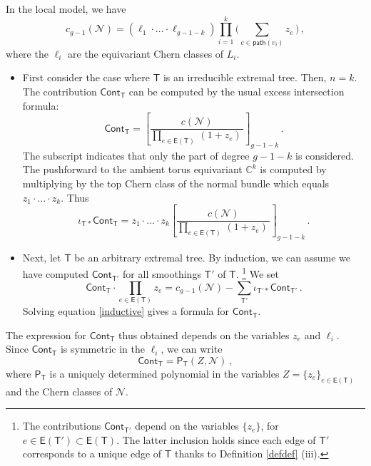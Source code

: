 \documentclass[11pt]{amsart}
\theoremstyle{definition}
\newcommand{\N}{\mathcal{N}}
\begin{document}
{In the local model, we have
\[
c_{g-1}(\N)=(\ell_1\cdot\ldots\cdot \ell_{g-1-k})\prod_{i=1}^k\big(\sum_{e\in \mathsf{path}(v_i)} z_e\, \big)\,,
\]
where the $\ell_i$ are the equivariant Chern classes of $L_i$.



\begin{itemize}
    \item [(i)] First consider the case where $\mathsf{T}$ is an irreducible extremal tree. Then, $n=k$. The contribution $\mathsf{Cont}_\mathsf{T}$ can be computed by the usual excess intersection formula:
    \begin{equation}\label{compcont}
    \mathsf{Cont}_\mathsf{T}=\left[\frac{c(\N)}{\prod_{e\in \mathsf E(\mathsf T)} \,(1+z_e)\,}\right]_{g-1-k}\,.
    \end{equation} The subscript indicates that only the part of degree $g-1-k$ is considered. 
    The pushforward to the ambient torus equivariant $\mathbb{C}^{k}$ is computed by multiplying by the top Chern class of the normal bundle which equals $z_1\cdot\ldots\cdot z_k$. Thus
    \[
    \iota_{\mathsf{T}*}\mathsf{Cont}_{\mathsf{T}}=z_1\cdot\ldots\cdot z_k\left[\frac{c(\N)}{\prod_{e\in \mathsf E(\mathsf T)} \,(1+z_e)\,}\right]_{g-1-k}\,.
    \]
    \item [(ii)] Next,  let $\mathsf{T}$ be an arbitrary extremal tree. By induction, we can assume we have computed $\mathsf{Cont}_{\mathsf{T}'}$ for all smoothings $\mathsf{T}'$ of $\mathsf{T}$. \footnote{The contributions $\mathsf {Cont}_{\mathsf T'}$ depend on the variables $\{z_e\}$, for $e\in \mathsf E(\mathsf T')\subset \mathsf E(\mathsf T)$. The latter inclusion holds since each edge of $\mathsf T'$ corresponds to a unique edge of $\mathsf{T}$ thanks to Definition \ref{defdef} (iii).} 
    We set
    \begin{equation}\label{inductive}
    \mathsf{Cont}_{\mathsf{T}}\cdot\prod_{e\in \mathsf{E}(\mathsf{T})} z_e=c_{g-1}(\N)-\sum_{\mathsf{T}'}\iota_{\mathsf{T}'*}\mathsf{Cont}_{\mathsf{T}'}\,.
    \end{equation}
    Solving equation \eqref{inductive} gives a formula for $\mathsf{Cont}_{\mathsf{T}}$.   
    \end{itemize}
    
    The expression for $\mathsf{Cont}_{\mathsf T}$ thus obtained depends on the variables $z_e$ and $\ell_i$. 
    Since $\mathsf{Cont}_{\mathsf T}$ is symmetric
    in the $\ell_i$,
    we can write
$$\mathsf{Cont}_{\mathsf{T}}= \mathsf{P}_{\mathsf{T}}(Z,\mathcal{N})\, ,$$
where 
$\mathsf{P}_{\mathsf{T}}$
is a uniquely determined polynomial in the
variables
$Z=\{z_e\}_{e\in \mathsf{E}(\mathsf{T})}$
and the Chern classes of $\mathcal{N}$.
    
}
\end{document}

